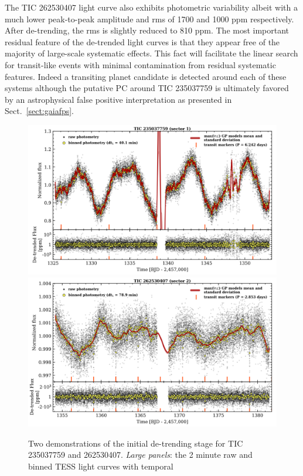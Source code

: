 The TIC 262530407 light curve also exhibits photometric variability albeit with a much lower peak-to-peak
amplitude and rms of 1700 and 1000 ppm respectively. After de-trending, the rms is slightly reduced to 
810 ppm. The most important residual feature of the de-trended light curves is that they appear free
of the majority of large-scale systematic effects. This fact will facilitate the linear search for
transit-like events with minimal contamination from residual systematic features. Indeed 
a transiting planet candidate is detected
around each of these systems although the putative PC around TIC 235037759
is ultimately favored by an astrophysical false positive interpretation as presented in
Sect.~\ref{sect:gaiafps}.

\begin{figure}
  \centering
  \includegraphics[width=0.9\hsize]{figures/GPdetrend_235037759.png}
  \includegraphics[width=0.9\hsize]{figures/GPdetrend_262530407.png}
  \caption[Examples of GP detrending of TESS light curves.]
      {Two demonstrations of the \pipeline{} initial de-trending stage for TIC 235037759 and 262530407.
    \emph{Large panels}: the 2 minute raw and binned TESS light curves with temporal
}
\end{figure}
